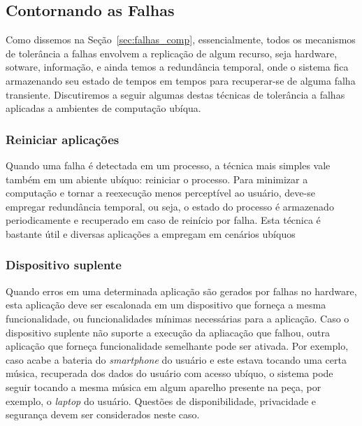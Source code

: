 
\subsection{Contornando as Falhas} %
\label{sub:contornando_as_falhas}

Como dissemos na Seção~\ref{sec:falhas_comp}, essencialmente, todos os mecanismos de tolerância a falhas envolvem a replicação de algum recurso, seja hardware, sotware, informação, e ainda temos a redundância temporal, onde o sistema fica armazenando seu estado de tempos em tempos para recuperar-se de alguma falha transiente. Discutiremos a seguir algumas destas técnicas de tolerância a falhas aplicadas a ambientes de computação ubíqua.

\subsubsection*{Reiniciar aplicações} %

Quando uma falha é detectada em um processo, a técnica mais simples vale também em um abiente ubíquo: reiniciar o processo. Para minimizar a computação e tornar a reexecução menos perceptível ao usuário, deve-se empregar redundância temporal, ou seja, o estado do processo é armazenado periodicamente e recuperado em caso de reinício por falha. Esta técnica é bastante útil e diversas aplicações a empregam em cenários ubíquos


\subsubsection*{Dispositivo suplente} %

Quando erros em uma determinada aplicação são gerados por falhas no hardware, esta aplicação deve ser escalonada em um dispositivo que forneça a mesma funcionalidade, ou funcionalidades mínimas necessárias para a aplicação. Caso o dispositivo suplente não suporte a execução da apliacação que falhou, outra aplicação que forneça funcionalidade semelhante pode ser ativada. Por exemplo, caso acabe a bateria do \emph{smartphone} do usuário e este estava tocando uma certa música, recuperada dos dados do usuário com acesso ubíquo, o sistema pode seguir tocando a mesma música em algum aparelho presente na peça, por exemplo, o \emph{laptop} do usuário. Questões de disponibilidade, privacidade e segurança devem ser considerados neste caso.

